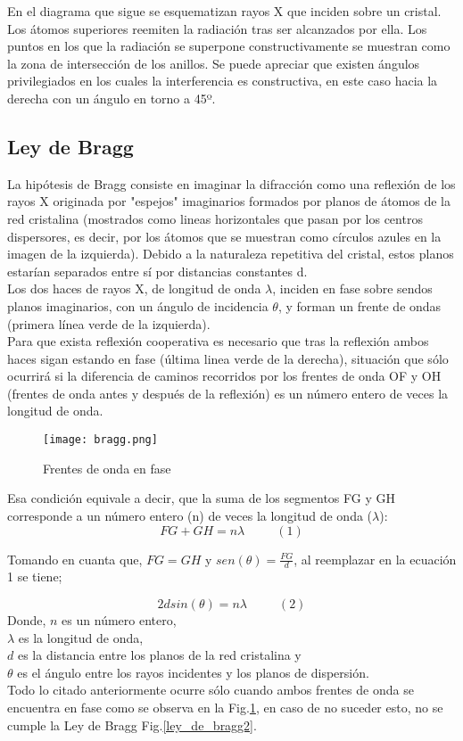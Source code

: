 \documentclass[a4paper, 11pt]{article}
\begin{document}
En el diagrama que sigue se esquematizan rayos X que inciden sobre un cristal. Los átomos superiores reemiten la radiación tras ser alcanzados por ella. Los puntos en los que la radiación se superpone constructivamente se muestran como la zona de intersección de los anillos. Se puede apreciar que existen ángulos privilegiados en los cuales la interferencia es constructiva, en este caso hacia la derecha con un ángulo en torno a 45º.

\subsection{Ley de Bragg}

La hipótesis de Bragg consiste en imaginar la difracción como una reflexión de los rayos X originada por "espejos" imaginarios formados por planos de átomos de la red cristalina (mostrados como lineas horizontales que pasan por los centros dispersores, es decir, por los átomos que se muestran como círculos azules en la imagen de la izquierda). Debido a la naturaleza repetitiva del cristal, estos planos estarían separados entre sí por distancias constantes d.\\
Los dos haces de rayos X, de longitud de onda $\lambda$, inciden en fase sobre sendos planos imaginarios, con un ángulo de incidencia $\theta$, y forman un frente de ondas (primera línea verde de la izquierda). \\
Para que exista reflexión cooperativa es necesario que tras la reflexión ambos haces sigan estando en fase (última linea verde de la derecha), situación que sólo ocurrirá si la diferencia de caminos recorridos  por los frentes de onda OF y OH (frentes de onda antes y después de la reflexión) es un número entero de veces la longitud de onda. 

\begin{figure}[h!] 
\centering
    \texttt{[image: bragg.png]}
     \caption{Frentes de onda en fase}
    \label{ley_de_bragg1}
\end{figure}

Esa condición equivale a decir, que la suma de los segmentos FG y GH corresponde a un número entero (n) de veces la longitud de onda ($\lambda$):
$$FG+GH=n\lambda \;\;\;\;\;\;\;\;\; (1)$$ 

Tomando en cuanta que, $FG=GH$ y $sen(\theta)=\frac{FG}{d}$, al reemplazar en la ecuación 1 se tiene;

$$2dsin(\theta)=n\lambda \;\;\;\;\;\;\;\;\; (2)$$
Donde,
$n$ es un número entero,\\
$\lambda$ es la longitud de onda,\\
$d$ es la distancia entre los planos de la red cristalina y\\
$\theta$ es el ángulo entre los rayos incidentes y los planos de dispersión.\\
Todo lo citado anteriormente ocurre sólo cuando ambos frentes de onda se encuentra en fase como se observa en la Fig.\ref{ley_de_bragg1}, en caso de no suceder esto, no se cumple la Ley de Bragg Fig.\ref{ley_de_bragg2}.
\end{document}
